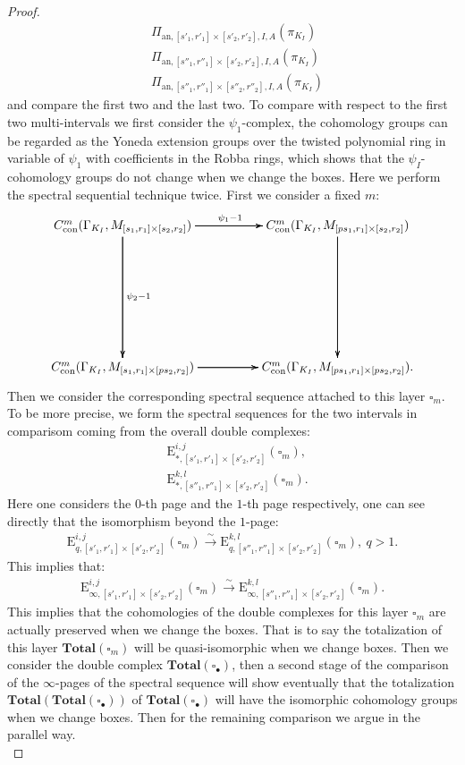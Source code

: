 \documentclass[12pt]{amsart}
\theoremstyle{definition}
\numberwithin{equation}{section}
\begin{document}
\begin{proof}
\begin{align}
&\Pi_{\mathrm{an},[s'_1,r'_1]\times [s'_2,r'_2],I,A}(\pi_{K_I})\\
&\Pi_{\mathrm{an},[s''_1,r''_1]\times [s'_2,r'_2],I,A}(\pi_{K_I})\\
&\Pi_{\mathrm{an},[s''_1,r''_1]\times [s''_2,r''_2],I,A}(\pi_{K_I})	
\end{align}
and compare the first two and the last two. To compare with respect to the first two multi-intervals we first consider the $\psi_1$-complex, the cohomology groups can be regarded as the  Yoneda extension groups over the twisted polynomial ring in variable of $\psi_1$ with coefficients in the Robba rings, which shows that the $\psi_I$-cohomology groups do not change when we change the boxes. Here we perform the spectral sequential technique twice. First we consider a fixed $m$:
\[
\xymatrix@R+6pc@C+2pc{
C^m_{\mathrm{con}}(\Gamma_{K_I},M_{[s_1,r_1]\times[s_2,r_2]}) \ar[r]^{\psi_1-1} \ar[r] \ar[r] \ar[d]^{\psi_2-1} \ar[d] \ar[d] & C^m_{\mathrm{con}}(\Gamma_{K_I},M_{[ps_1,r_1]\times[s_2,r_2]}) \ar[d] \ar[d] \ar[d]\\
C^m_{\mathrm{con}}(\Gamma_{K_I},M_{[s_1,r_1]\times[ps_2,r_2]})\ar[r] \ar[r] \ar[r]  &C^m_{\mathrm{con}}(\Gamma_{K_I},M_{[ps_1,r_1]\times[ps_2,r_2]}). 
}
\]
Then we consider the corresponding spectral sequence attached to this layer $\square_m$. To be more precise, we form the spectral sequences for the two intervals in comparisom coming from the overall double complexes:
\begin{align}
&\mathrm{E}^{i,j}_{*,[s'_1,r'_1]\times [s'_2,r'_2]}(\square_m),\\
&\mathrm{E}^{k,l}_{*,[s''_1,r''_1]\times [s'_2,r'_2]}(\square_m).
\end{align}
Here one considers the $0$-th page and the $1$-th page respectively, one can see directly that the isomorphism beyond the $1$-page:
\begin{align}
\mathrm{E}^{i,j}_{q,[s'_1,r'_1]\times [s'_2,r'_2]}(\square_m)\overset{\sim}{\longrightarrow}\mathrm{E}^{k,l}_{q,[s''_1,r''_1]\times [s'_2,r'_2]}(\square_m),~q>1.
\end{align}
This implies that:
\begin{align}
\mathrm{E}^{i,j}_{\infty,[s'_1,r'_1]\times [s'_2,r'_2]}(\square_m)\overset{\sim}{\longrightarrow}\mathrm{E}^{k,l}_{\infty,[s''_1,r''_1]\times [s'_2,r'_2]}(\square_m).
\end{align}
This implies that the cohomologies of the double complexes for this layer $\square_m$ are actually preserved when we change the boxes. That is to say  the totalization of this layer $\mathbf{Total}(\square_m)$ will be quasi-isomorphic when we change boxes. Then we consider the double complex $\mathbf{Total}(\square_\bullet)$, then a second stage of the comparison of the $\infty$-pages of the spectral sequence will show eventually that the totalization $\mathbf{Total}\left(\mathbf{Total}(\square_\bullet)\right)$ of $\mathbf{Total}(\square_\bullet)$ will have the isomorphic cohomology groups when we change boxes. Then for the remaining comparison we argue in the parallel way. \\

\end{proof}
\end{document}
